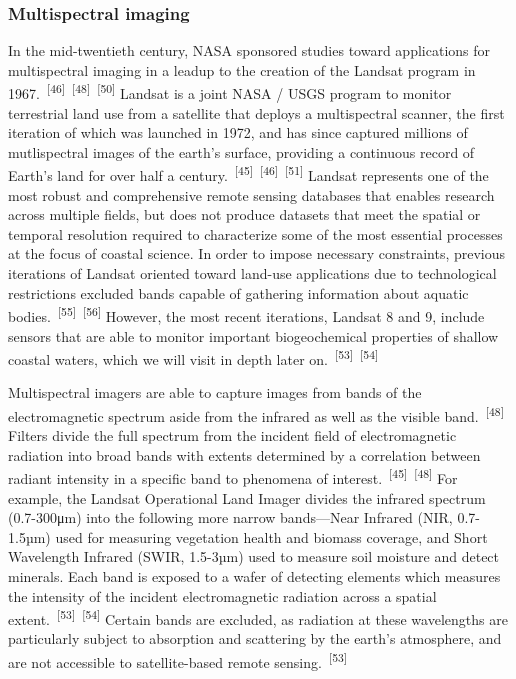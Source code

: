 \documentclass{article}
\begin{document}
\subsubsection{Multispectral imaging}


\par{In the mid-twentieth century, NASA sponsored studies toward applications for multispectral imaging in a leadup to the creation of the Landsat program in 1967.~\textsuperscript{[46]}~\textsuperscript{[48]}~\textsuperscript{[50]} Landsat is a joint NASA / USGS program to monitor terrestrial land use from a satellite that deploys a multispectral scanner, the first iteration of which was launched in 1972, and has since captured millions of mutlispectral images of the earth's surface, providing a continuous record of Earth's land for over half a century.~\textsuperscript{[45]}~\textsuperscript{[46]}~\textsuperscript{[51]} Landsat represents one of the most robust and comprehensive remote sensing databases that enables research across multiple fields, but does not produce datasets that meet the spatial or temporal resolution required to characterize some of the most essential processes at the focus of coastal science. In order to impose necessary constraints, previous iterations of Landsat oriented toward land-use applications due to technological restrictions excluded bands capable of gathering information about aquatic bodies.~\textsuperscript{[55]}~\textsuperscript{[56]} However, the most recent iterations, Landsat 8 and 9, include sensors that are able to monitor important biogeochemical properties of shallow coastal waters, which we will visit in depth later on.~\textsuperscript{[53]}~\textsuperscript{[54]}}


\par{Multispectral imagers are able to capture images from bands of the electromagnetic spectrum aside from the infrared as well as the visible band.~\textsuperscript{[48]} Filters divide the full spectrum from the incident field of electromagnetic radiation into broad bands with extents determined by a correlation between radiant intensity in a specific band to phenomena of interest.~\textsuperscript{[45]}~\textsuperscript{[48]} For example, the Landsat Operational Land Imager divides the infrared spectrum (0.7-300μm) into the following more narrow bands---Near Infrared (NIR, 0.7-1.5µm) used for measuring vegetation health and biomass coverage, and Short Wavelength Infrared (SWIR, 1.5-3µm) used to measure soil moisture and detect minerals. Each band is exposed to a wafer of detecting elements which measures the intensity of the incident electromagnetic radiation across a spatial extent.~\textsuperscript{[53]}~\textsuperscript{[54]} Certain bands are excluded, as radiation at these wavelengths are particularly subject to absorption and scattering by the earth's atmosphere, and are not accessible to satellite-based remote sensing.~\textsuperscript{[53]}}
\end{document}
